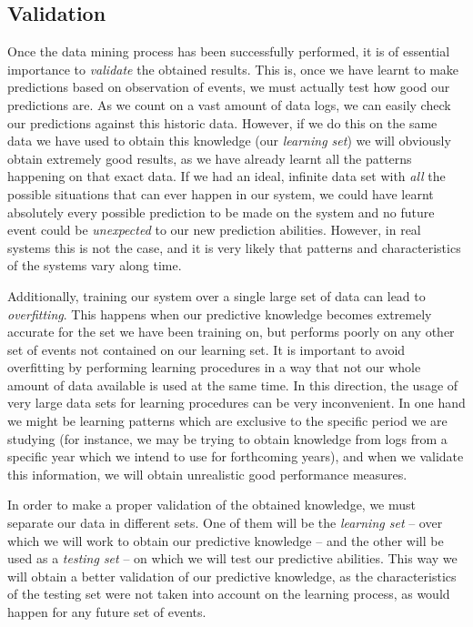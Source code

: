 \documentclass[a4paper,12pt]{article}
\begin{document}
\subsection{Validation}
Once the data mining process has been successfully performed, it is of essential importance to \emph{validate} the obtained results. This is, once we have learnt to make predictions based on observation of events, we must actually test how good our predictions are. As we count on a vast amount of data logs, we can easily check our predictions against this historic data. However, if we do this on the same data we have used to obtain this knowledge (our \emph{learning set}) we will obviously obtain extremely good results, as we have already learnt all the patterns happening on that exact data. If we had an ideal, infinite data set with \emph{all} the possible situations that can ever happen in our system, we could have learnt absolutely every possible prediction to be made on the system and no future event could be \emph{unexpected} to our new prediction abilities. However, in real systems this is not the case, and it is very likely that patterns and characteristics of the systems vary along time. 

Additionally, training our system over a single large set of data can lead to \emph{overfitting}. This happens when our predictive knowledge becomes extremely accurate for the set we have been training on, but performs poorly on any other set of events not contained on our learning set. It is important to avoid overfitting by performing learning procedures in a way that not our whole amount of data available is used at the same time. In this direction, the usage of very large data sets for learning procedures can be very inconvenient. In one hand we might be learning patterns which are exclusive to the specific period we are studying (for instance, we may be trying to obtain knowledge from logs from a specific year which we intend to use for forthcoming years), and when we validate this information, we will obtain unrealistic good performance measures.

In order to make a proper validation of the obtained knowledge, we must separate our data in different sets. One of them will be the \emph{learning set} -- over which we will work to obtain our predictive knowledge -- and the other will be used as a \emph{testing set} -- on which we will test our predictive abilities. This way we will obtain a better validation of our predictive knowledge, as the characteristics of the testing set were not taken into account on the learning process, as  would happen for any future set of events.
\end{document}
